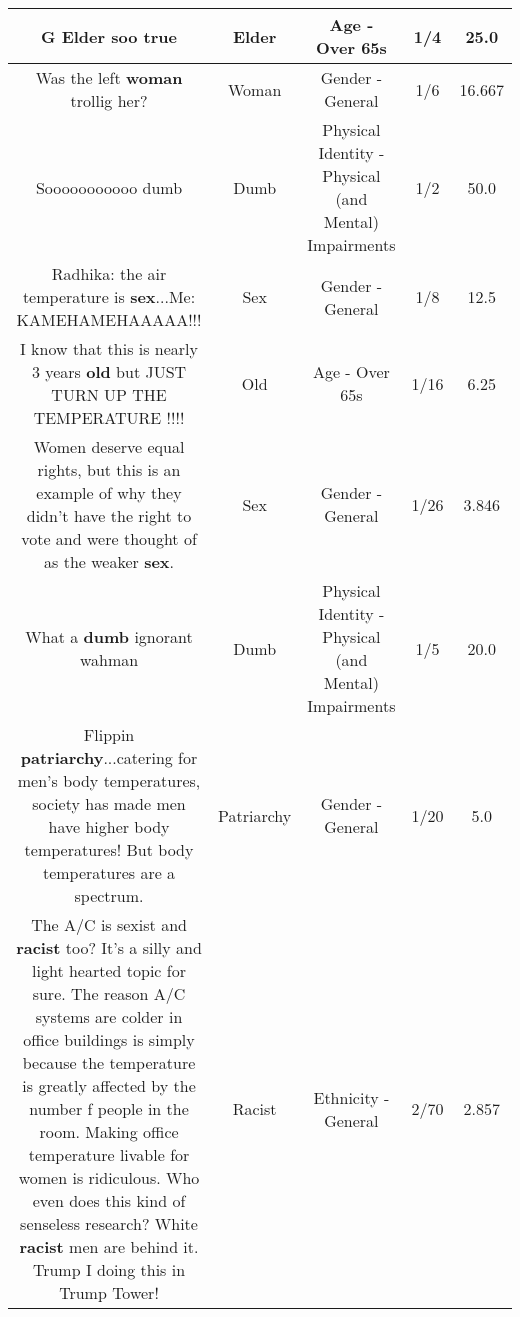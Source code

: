 \documentclass[11pt]{article}
\newlength\mylength
\begin{document}
\begin{center}
\begin{longtable}{|C{.65\mylength}|C{.30\mylength}|C{.12\mylength}|C{.12\mylength}|C{.12\mylength}|}
  \small G \textbf{Elder} soo true\normalsize   & Elder & Age - Over 65s & 1/4 & 25.0 \\  \hline
  \small Was the left \textbf{woman} trollig her?\normalsize   & Woman & Gender - General & 1/6 & 16.667 \\  \hline
  \small Sooooooooooo dumb\normalsize   & Dumb & Physical Identity - Physical (and Mental) Impairments & 1/2 & 50.0 \\  \hline
  \small Radhika: the air temperature is \textbf{sex}...Me: KAMEHAMEHAAAAA!!!\normalsize   & Sex & Gender - General & 1/8 & 12.5 \\  \hline
  \small I know that this is nearly 3 years \textbf{old} but JUST TURN UP THE TEMPERATURE !!!!\normalsize   & Old & Age - Over 65s & 1/16 & 6.25 \\  \hline
  \small Women deserve equal rights, but this is an example of why they didn't have the right to vote and were thought of as the weaker \textbf{sex}.\normalsize   & Sex & Gender - General & 1/26 & 3.846 \\  \hline
  \small What a \textbf{dumb} ignorant wahman\normalsize   & Dumb & Physical Identity - Physical (and Mental) Impairments & 1/5 & 20.0 \\  \hline
  \small Flippin \textbf{patriarchy}...catering for men's body temperatures, society has made men have higher body temperatures! But body temperatures are a spectrum.\normalsize   & Patriarchy & Gender - General & 1/20 & 5.0 \\  \hline
  \small The A/C is sexist and \textbf{racist} too? It's a silly and light hearted topic for sure. The reason A/C systems are colder in office buildings is simply because the temperature is greatly affected by the number f people in the room. Making office temperature livable for women is ridiculous. Who even does this kind of senseless research? White \textbf{racist} men are behind it. Trump I doing this in Trump Tower!\normalsize   & Racist & Ethnicity - General & 2/70 & 2.857 \\  \hline

\end{longtable}
\end{center}
\end{document}
